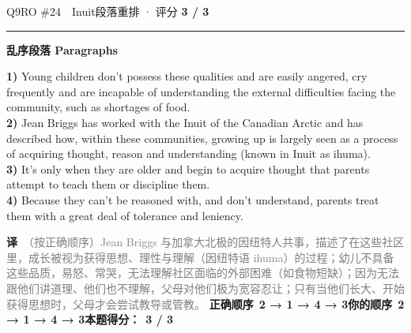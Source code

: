 \documentclass[11pt]{article}
\newcommand{\ptesub}[1]{%
  \par\needspace{2\baselineskip}\smallskip
  {\color{cAccent}\rule[-0.2ex]{3pt}{1.05em}}\hspace{6pt}%
  {\bfseries\color{cHead}#1}\par\nopagebreak\smallskip}
\newcommand{\zh}[1]{{\footnotesize\textcolor{cNote}{\textbf{译}}\ \textcolor{gray}{#1}}}
\begin{document}
\begin{qblock}{Q9\quad RO \#24\ \ Inuit}{段落重排 · 评分 \textcolor{cAccent}{\bfseries 3 / 3}}
\ptesub{乱序段落 Paragraphs}
\begin{promptbox}
\textbf{1)} Young children don't possess these qualities and are easily angered, cry frequently and are incapable of understanding the external difficulties facing the community, such as shortages of food.\\
\textbf{2)} Jean Briggs has worked with the Inuit of the Canadian Arctic and has described how, within these communities, growing up is largely seen as a process of acquiring thought, reason and understanding (known in Inuit as ihuma).\\
\textbf{3)} It's only when they are older and begin to acquire thought that parents attempt to teach them or discipline them.\\
\textbf{4)} Because they can't be reasoned with, and don't understand, parents treat them with a great deal of tolerance and leniency.
\end{promptbox}
\zh{（按正确顺序）Jean Briggs 与加拿大北极的因纽特人共事，描述了在这些社区里，成长被视为获得思想、理性与理解（因纽特语 ihuma）的过程；幼儿不具备这些品质，易怒、常哭，无法理解社区面临的外部困难（如食物短缺）；因为无法跟他们讲道理、他们也不理解，父母对他们极为宽容忍让；只有当他们长大、开始获得思想时，父母才会尝试教导或管教。}
\smallskip
\textbf{正确顺序}\ \textcolor{cFix}{\bfseries 2 → 1 → 4 → 3}\qquad\textbf{你的顺序}\ \textcolor{cFix}{\bfseries 2 → 1 → 4 → 3}\qquad\textbf{本题得分：}\ {\color{cAccent}\bfseries 3 / 3}
\end{qblock}
\end{document}
